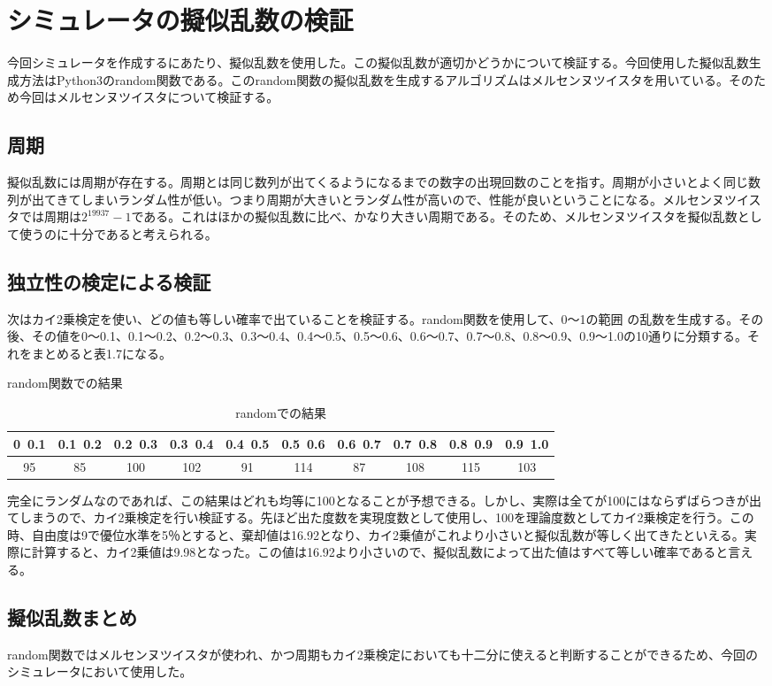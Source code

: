 \section{シミュレータの擬似乱数の検証}
今回シミュレータを作成するにあたり、擬似乱数を使用した。この擬似乱数が適切かどうかについて検証する。今回使用した擬似乱数生成方法はPython3のrandom関数である。このrandom関数の擬似乱数を生成するアルゴリズムはメルセンヌツイスタを用いている。そのため今回はメルセンヌツイスタについて検証する。
\subsection{周期}
擬似乱数には周期が存在する。周期とは同じ数列が出てくるようになるまでの数字の出現回数のことを指す。周期が小さいとよく同じ数列が出てきてしまいランダム性が低い。つまり周期が大きいとランダム性が高いので、性能が良いということになる。メルセンヌツイスタでは周期は$2^{19937}-1$である。これはほかの擬似乱数に比べ、かなり大きい周期である。そのため、メルセンヌツイスタを擬似乱数として使うのに十分であると考えられる。
\subsection{独立性の検定による検証}
次はカイ2乗検定を使い、どの値も等しい確率で出ていることを検証する。random関数を使用して、0～1の範囲
の乱数を生成する。その後、その値を0～0.1、0.1～0.2、0.2～0.3、0.3～0.4、0.4～0.5、0.5～0.6、0.6～0.7、0.7～0.8、0.8～0.9、0.9～1.0の10通りに分類する。それをまとめると表1.7になる。

\begin{table}[H]
 \caption{random関数での結果}
 \begin{center}
\caption{randomでの結果}
  \begin{tabular}{|c|c|c|c|c|c|c|c|c|c|} \hline 
  0~0.1 &  0.1~0.2 & 0.2~0.3 & 0.3~0.4 &  0.4~0.5 & 0.5~0.6 & 0.6~0.7 & 0.7~0.8 & 0.8~0.9 & 0.9~1.0 \\ \hline 
  95 & 85 & 100 & 102 & 91 & 114 & 87 & 108 & 115 & 103 \\ \hline
  \end{tabular}
   \label{x2}
 \end{center}
\end{table}

完全にランダムなのであれば、この結果はどれも均等に100となることが予想できる。しかし、実際は全てが100にはならずばらつきが出てしまうので、カイ2乗検定を行い検証する。先ほど出た度数を実現度数として使用し、100を理論度数としてカイ2乗検定を行う。この時、自由度は9で優位水準を5％とすると、棄却値は16.92となり、カイ2乗値がこれより小さいと擬似乱数が等しく出てきたといえる。実際に計算すると、カイ2乗値は9.98となった。この値は16.92より小さいので、擬似乱数によって出た値はすべて等しい確率であると言える。
\subsection{擬似乱数まとめ}
random関数ではメルセンヌツイスタが使われ、かつ周期もカイ2乗検定においても十二分に使えると判断することができるため、今回のシミュレータにおいて使用した。
